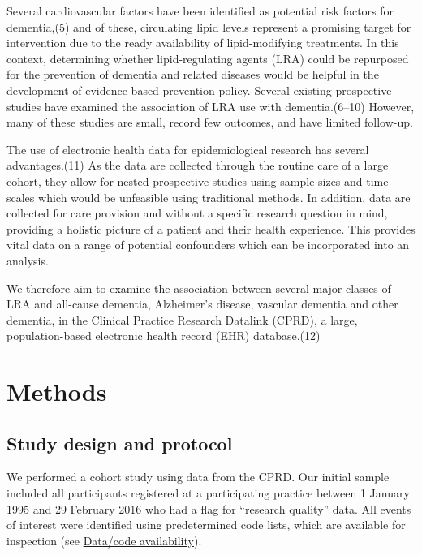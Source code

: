 \documentclass[
]{article}
\begin{document}
Several cardiovascular factors have been identified as potential risk factors for dementia,(5) and of these, circulating lipid levels represent a promising target for intervention due to the ready availability of lipid-modifying treatments. In this context, determining whether lipid-regulating agents (LRA) could be repurposed for the prevention of dementia and related diseases would be helpful in the development of evidence-based prevention policy. Several existing prospective studies have examined the association of LRA use with dementia.(6--10) However, many of these studies are small, record few outcomes, and have limited follow-up.

The use of electronic health data for epidemiological research has several advantages.(11) As the data are collected through the routine care of a large cohort, they allow for nested prospective studies using sample sizes and time-scales which would be unfeasible using traditional methods. In addition, data are collected for care provision and without a specific research question in mind, providing a holistic picture of a patient and their health experience. This provides vital data on a range of potential confounders which can be incorporated into an analysis.

We therefore aim to examine the association between several major classes of LRA and all-cause dementia, Alzheimer's disease, vascular dementia and other dementia, in the Clinical Practice Research Datalink (CPRD), a large, population-based electronic health record (EHR) database.(12)

\newpage

\hypertarget{methods}{%
\section{Methods}\label{methods}}

\hypertarget{study-design-and-protocol}{%
\subsection{Study design and protocol}\label{study-design-and-protocol}}

We performed a cohort study using data from the CPRD. Our initial sample included all participants registered at a participating practice between 1 January 1995 and 29 February 2016 who had a flag for ``research quality'' data. All events of interest were identified using predetermined code lists, which are available for inspection (see \protect\hyperlink{data-code-avail}{Data/code availability}).
\end{document}
